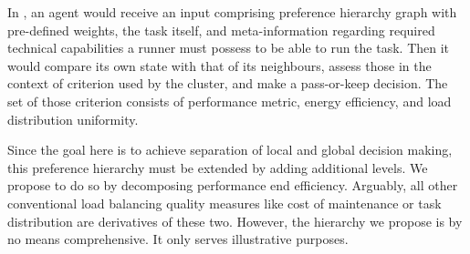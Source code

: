 In \cite{murashov-2022}, an agent would receive an input comprising preference hierarchy graph with pre-defined weights, the task itself, and meta-information regarding required technical capabilities a runner must possess to be able to run the task.
Then it would compare its own state with that of its neighbours, assess those in the context of criterion used by the cluster, and make a pass-or-keep decision.
The set of those criterion consists of performance metric, energy efficiency, and load distribution uniformity.

Since the goal here is to achieve separation of local and global decision making, this preference hierarchy must be extended by adding additional levels.
We propose to do so by decomposing performance end efficiency.
Arguably, all other conventional load balancing quality measures like cost of maintenance or task distribution are derivatives of these two.
However, the hierarchy we propose is by no means comprehensive.
It only serves illustrative purposes.
